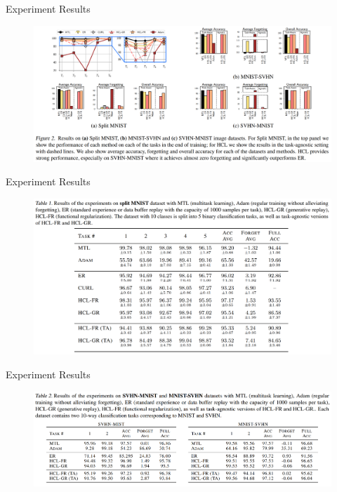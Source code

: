 \documentclass{beamer}
\begin{document}
\begin{frame}{Experiment Results}
  \begin{figure}
    \includegraphics[width=1\textwidth]{./figures/Experiment_result_on_MNIST}
  \end{figure}
\end{frame}

\begin{frame}{Experiment Results}
  \begin{figure}
    \includegraphics[width=1\textwidth]{./figures/Split_MNIST_Results}
  \end{figure}
\end{frame}

\begin{frame}{Experiment Results}
  \begin{figure}
    \includegraphics[width=1\textwidth]{./figures/MNIST_SVHN_Results}
  \end{figure}
\end{frame}
\end{document}
